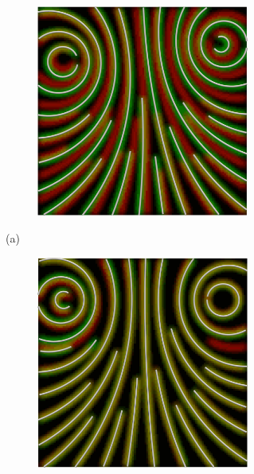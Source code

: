 \begin{figure}[ht]
\begin{subfigure}{\textwidth}
\begin{subfigure}{.19\textwidth}
        \end{subfigure}
        \begin{subfigure}{.19\textwidth}
            \centering
            \includegraphics[scale=.055]{figures/AlphaStudy/GyroNC.0004.png}
        \end{subfigure}
        \caption*{(a)}
    \end{subfigure}
    \begin{subfigure}{\textwidth}
        \begin{subfigure}{.19\textwidth}
            \centering
            \includegraphics[scale=.0515]{figures/AlphaStudy/Gyro13C.0000.png}

\end{subfigure}
\end{subfigure}
\end{figure}
